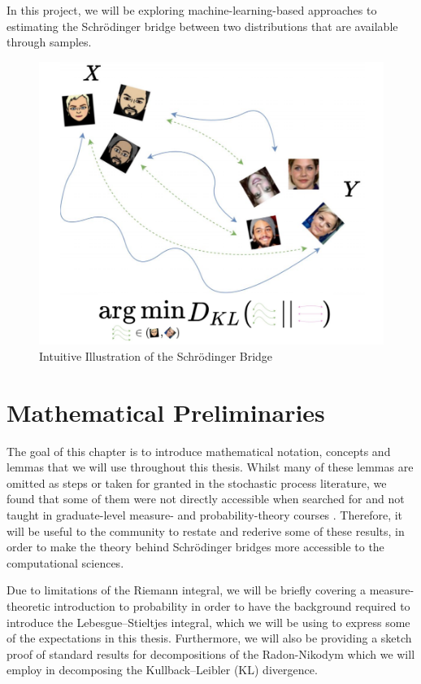 \documentclass[a4paper,12pt,twoside,openright]{report}
\theoremstyle{definition}
\begin{document}
 In this project, we will be exploring machine-learning-based approaches to estimating the Schrödinger bridge between two distributions that are available through samples.
\begin{figure}
    \centering
    \includegraphics[scale=0.7]{images/charicaturistic_bridge.PNG}
    \caption{Intuitive Illustration of the Schrödinger Bridge}
    \label{fig:intuitive_bridge}
\end{figure}

 
\chapter{Mathematical Preliminaries}


The goal of this chapter is to introduce mathematical notation, concepts and lemmas that we will use throughout this thesis. Whilst many of these lemmas are omitted as steps or taken for granted in the stochastic process literature, we found that some of them were not directly accessible when searched for and not taught in graduate-level measure- and probability-theory courses \citep{ethmeasure,mitmeasure,cambprob}. Therefore, it will be useful to the community to restate and rederive some of these results, in order to make the theory behind Schrödinger bridges more accessible to the computational sciences.

Due to limitations of the Riemann integral, we will be briefly covering a measure-theoretic introduction to probability in order to have the background required to introduce the  Lebesgue–Stieltjes integral, which we will be using to express some of the expectations in this thesis. Furthermore, we will also be providing a sketch proof of standard results for decompositions of the Radon-Nikodym which we will employ in decomposing the Kullback–Leibler (KL) divergence. 
\end{document}
